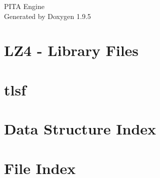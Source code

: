 \documentclass[twoside]{book}
\newcommand{\+}{\discretionary{\mbox{\scriptsize$\hookleftarrow$}}{}{}}
\newcommand{\clearemptydoublepage}{%
    \newpage{\pagestyle{empty}\cleardoublepage}%
  }
\begin{document}
  \raggedbottom
    \hypersetup{pageanchor=false,
                bookmarksnumbered=true,
                pdfencoding=unicode
               }
  \begin{titlepage}
  \vspace*{7cm}
  \begin{center}%
  {\Large PITA Engine}\\
  \vspace*{1cm}
  {\large Generated by Doxygen 1.9.5}\\
  \end{center}
  \end{titlepage}
  \clearemptydoublepage
  \tableofcontents
  \clearemptydoublepage
  \hypersetup{pageanchor=true}
\chapter{LZ4 -\/ Library Files}
\label{md_src_lz4__r_e_a_d_m_e}

\chapter{tlsf}
\label{md_src_tlsf__r_e_a_d_m_e}

\chapter{Data Structure Index}

\chapter{File Index}

\end{document}
